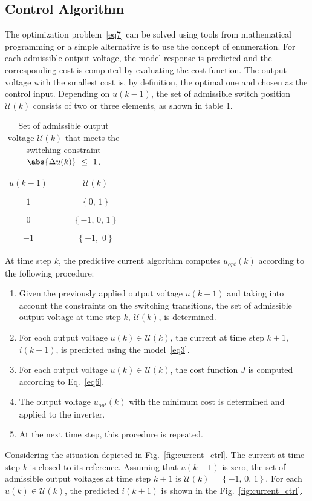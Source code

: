 \documentclass[12pt,a4paper,oneside]{book}
\begin{document}
\begin{onehalfspace}
\subsection{Control Algorithm} 
The optimization problem~\ref{eq7} can be solved using tools from mathematical 
programming or a simple alternative is to use the concept of enumeration. For 
each admissible output voltage, the model response is predicted and the 
corresponding cost is computed by evaluating the cost function. The output 
voltage with the smallest cost is, by definition, the optimal one and chosen as 
the control input. Depending on $u(k-1)$, the set of admissible switch position 
$\mathcal{U}(k)$ consists of two or three elements, as shown in table 
\ref{tepm}.
\begin{table}[H]
	\begin{center}
		\begin{tabular}{c|c}
			$u(k-1)\quad$ & $\quad \mathcal{U}(k)$ \\[6pt]
			\hline \\
			$1\quad$ 	& $\quad \left\lbrace 0,\,1\right\rbrace$ \\ \\
			$0\quad$ 	& $\quad \left\lbrace -1,\,0,\,1\right\rbrace$ \\ \\
			$-1\quad$	& $\quad \left\lbrace -1, \,\,0\right\rbrace$ \\
		\end{tabular}
	\end{center}
	\captionsetup{width=.5\textwidth}
	\caption{Set of admissible output voltage $\mathcal{U}(k)$ that meets the 
	switching constraint $\abs{\Delta u(k)}~\le~1$.}
	\label{tepm}
\end{table}
At time step $k$, the predictive current algorithm computes $u_{opt}(k)$ 
according to the following procedure:
\begin{enumerate}
	\item Given the previously applied output voltage $u(k-1)$ and taking into 
	account the constraints on the switching transitions, the set of admissible 
	output voltage at time step $k$, $\mathcal{U}(k)$, is determined.
	\item For each output voltage $u(k) \in \mathcal{U}(k)$, the current at 
	time step $k+1$, $i(k+1)$, is predicted using the model~\ref{eq3}.
	\item For each output voltage $u(k) \in \mathcal{U}(k)$, the cost function 
	$J$ is computed according to Eq.~\eqref{eq6}.
	\item The output voltage $u_{opt}(k)$ with the minimum cost is determined 
	and applied to the inverter.
	\item At the next time step, this procedure is repeated.
\end{enumerate}
Considering the situation depicted in Fig.~\ref{fig:current_ctrl}. The current 
at time step $k$ is closed to its reference. Assuming that $u(k-1)$ is zero, 
the set of admissible output voltages at time step $k+1$ is $\mathcal{U}(k) = 
\left\lbrace-1,\,0,\,1 \right\rbrace $. For each $u(k)\in\mathcal{U}(k)$, the 
predicted $i(k+1)$ is shown in the Fig.~\ref{fig:current_ctrl}.


\end{onehalfspace}
\end{document}
